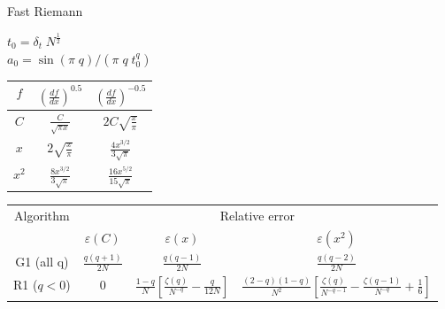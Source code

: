 \documentclass{article}
\begin{document}
\begin{algorithm}
    \caption{Fast Riemann} 
    
    \BlankLine
    $t_0 = \delta_t\; N^{\frac{1}{2}}$\\
    \BlankLine
    $a_0 = \sin(\pi\; q)/(\pi\; q\;t_0^q)$\\    
    \BlankLine
    \BlankLine

\end{algorithm}

   
    
    \begin{center}
        \begin{tabular}{c|cc}
            $f$ & $\left(\frac{df}{dx}\right)^{0.5}$ & $\left(\frac{df}{dx}\right)^{-0.5}$\\
            \hline
            $C$ & $\frac{C}{\sqrt{\pi x}}$ & $ 2C\sqrt{\frac{x}{\pi}}$ \\
            $x$ & $2\sqrt{\frac{x}{\pi}}$ & $\frac{4x^{3/2}}{3\sqrt{\pi}}$ \\
            $x^2$ & $\frac{8x^{3/2}}{3\sqrt{\pi}}$ & $\frac{16x^{5/2}}{15\sqrt{\pi}}$\\
        \end{tabular}
        
        \vspace{2cm}
        
        \begin{tabular}{ c| c  c c }
            Algorithm & \multicolumn{3}{c}{Relative error}\\
            &$\varepsilon(C)$ &  $\varepsilon(x)$ & $\varepsilon(x^2)$ \\ 
            \hline
            G1 (all q) & $\frac{ q(q+1)}{2N}$ & $\frac{ q(q-1)}{2N}$ & $\frac{ q(q-2)}{2N}$ \\  
            R1 ($q<0$) & 0 & $\frac{1-q}{N}\left[\frac{\zeta(q)}{N^{-q}}-\frac{q}{12N}\right]$ & 
            $\frac{(2-q)(1-q)}{N^2}\left[\frac{\zeta(q)}{N^{-q-1}}-\frac{\zeta(q-1)}{N^{-q}} + \frac{1}{6}\right]$
        \end{tabular}
    \end{center}
\end{document}
